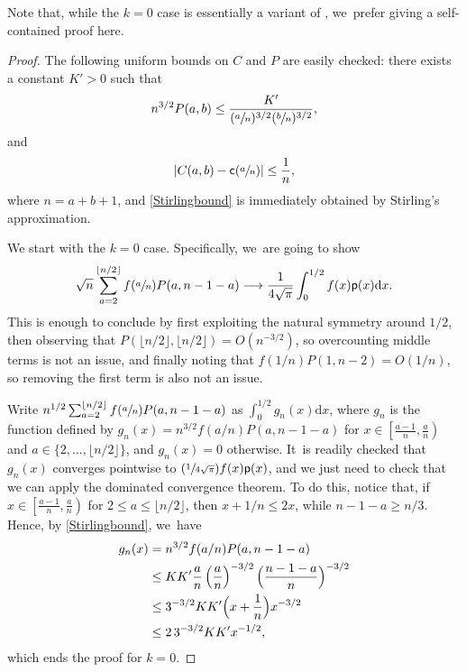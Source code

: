 \documentclass[11pt]{article}
\newcommand{\Psfrac}[2]{(\sfrac{#1}{#2})}
\newcommand{\pp}{\mathsf{p}}
\newcommand{\cc}{\mathsf{c}}\let\ff\cc
\newcommand{\dd}{\mathrm{d}}
\theoremstyle{definition}
\begin{document}
Note that, while the $k=0$ case is essentially a variant of \cite[Prop.\,39]{HM12}, we~prefer giving a self-contained proof here.
\begin{proof} The following uniform bounds on $C$ and $P$ are easily checked: there exists a constant $K'>0$ such that
\begin{equation}\label{Stirlingbound}
n^{3/2} P(a,b) \leq \frac{K'}{(\sfrac{a}{n})^{3/2}(\sfrac{b}{n})^{3/2}},
\end{equation}
and
\begin{equation}\label{eq:boundc1}
\left|C(a,b)-\cc{\left(\sfrac{a}{n}\right)}\right|\leq\frac1n,
\end{equation}
where $n=a+b+1$, and \eqref{Stirlingbound} is immediately obtained by Stirling's approximation.

We start with the $k=0$ case. Specifically, we~are going to show
\[
\sqrt{n} \sum_{a=2}^{\lfloor n/2\rfloor} f{(\sfrac{a}{n})}P(a,n-1-a) \longrightarrow \frac{1}{4\sqrt{\pi}}\int_0^{1/2} f(x) \pp(x) \dd x.
\]
This is enough to conclude by first exploiting the natural symmetry around $1/2$, then observing that $P(\lfloor n/2\rfloor,\lfloor n/2 \rfloor)=O(n^{-3/2})$, so overcounting middle terms is not an issue, and finally noting that $f(1/n)P(1,n-2)=O(1/n)$, so removing the first term is also not an issue.

Write $n^{1/2}\sum_{a=2}^{\lfloor n/2\rfloor} f(\sfrac{a}{n})P(a,n-1-a)$ as $\int_{0}^{1/2} g_n(x)\mathrm{d}x$, where $g_n$ is the function defined by $g_n(x)=n^{3/2}f(a/n)P(a,n-1-a)$ for $x\in \left[\frac{a-1}{n},\frac{a}{n}\right)$ and $a\in \{2,\ldots,\lfloor n/2\rfloor\}$, and $g_n(x)=0$ otherwise. It~is readily checked that $g_n(x)$ converges pointwise to $\Psfrac1{4\sqrt{\pi}}f(x) \pp(x)$, and we just need to check that we can apply the dominated convergence theorem. To do this, notice that, if $x\in \left[\frac{a-1}{n},\frac{a}{n}\right)$ for $2\leq a \leq \lfloor n/2\rfloor$, then $x+1/n\leq 2x$, while $n-1-a\geq n/3$. Hence, by \eqref{Stirlingbound}, we~have
\begin{align*}
g_n(x)& =n^{3/2}f(a/n)P(a,n-1-a) \\
&\leq KK'\frac{a}{n} \left(\frac{a}{n}\right)^{-3/2}\Bigl(\frac{n-1-a}{n}\Bigr)^{-3/2} \\
&\leq 3^{-3/2}KK' \Bigl(x+\frac{1}{n}\Bigr)x^{-3/2} \\
&\leq 2\,3^{-3/2}KK'x^{-1/2},
\end{align*}
which ends the proof for $k=0$.


\end{proof}
\end{document}
